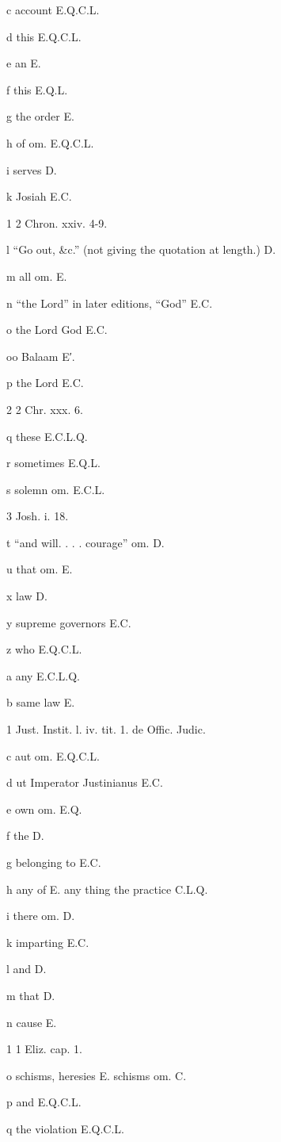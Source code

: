 c
account E.Q.C.L.

d
this E.Q.C.L.

e
an E.

f
this E.Q.L.

g
the order E.

h
of om. E.Q.C.L.

i
serves D.

k
Josiah E.C.

1
2 Chron. xxiv. 4-9.

l
“Go out, &c.” (not giving the quotation at length.) D.

m
all om. E.

n
“the Lord” in later editions, “God” E.C.

o
the Lord God E.C.

oo
Balaam E′.

p
the Lord E.C.

2
2 Chr. xxx. 6.

q
these E.C.L.Q.

r
sometimes E.Q.L.

s
solemn om. E.C.L.

3
Josh. i. 18.

t
“and will. . . . courage” om. D.

u
that om. E.

x
law D.

y
supreme governors E.C.

z
who E.Q.C.L.

a
any E.C.L.Q.

b
same law E.

1
Just. Instit. l. iv. tit. 1. de Offic. Judic.

c
aut om. E.Q.C.L.

d
ut Imperator Justinianus E.C.

e
own om. E.Q.

f
the D.

g
belonging to E.C.

h
any of E. any thing the practice C.L.Q.

i
there om. D.

k
imparting E.C.

l
and D.

m
that D.

n
cause E.

1
1 Eliz. cap. 1.

o
schisms, heresies E. schisms om. C.

p
and E.Q.C.L.

q
the violation E.Q.C.L.

